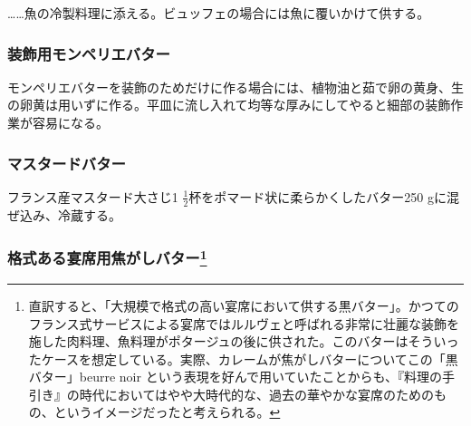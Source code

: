 \begin{recette}
\ldots{}\ldots{}魚の冷製料理に添える。ビュッフェの場合には魚に覆いかけて供する。

\hypertarget{beurre-de-montpellier-pour-croutonnage-de-plats}{%
\subsubsection{装飾用モンペリエバター}\label{beurre-de-montpellier-pour-croutonnage-de-plats}}



モンペリエバターを装飾のためだけに作る場合には、植物油と茹で卵の黄身、生の卵黄は用いずに作る。平皿に流し入れて均等な厚みにしてやると細部の装飾作業が容易になる。

\hypertarget{beurre-de-moutarde}{%
\subsubsection{マスタードバター}\label{beurre-de-moutarde}}



フランス産マスタード大さじ1
\(\frac{1}{2}\)杯をポマード状に柔らかくしたバター250
gに混ぜ込み、冷蔵する。

\hypertarget{beurre-noir-pour-les-grands-services}{%
\subsubsection[格式ある宴席用焦がしバター]{\texorpdfstring{格式ある宴席用焦がしバター\footnote{直訳すると、「大規模で格式の高い宴席において供する黒バター」。かつてのフランス式サービスによる宴席ではルルヴェと呼ばれる非常に壮麗な装飾を施した肉料理、魚料理がポタージュの後に供された。このバターはそういったケースを想定している。実際、カレームが焦がしバターについてこの「黒バター」beurre
  noir
  という表現を好んで用いていたことからも、『料理の手引き』の時代においてはやや大時代的な、過去の華やかな宴席のためのもの、というイメージだったと考えられる。}}{格式ある宴席用焦がしバター}}\label{beurre-noir-pour-les-grands-services}}


\end{recette}
